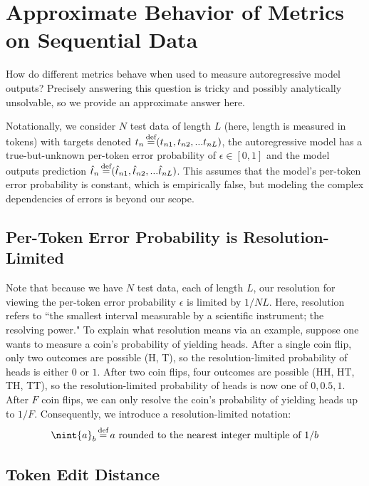 \section{Approximate Behavior of Metrics on Sequential Data}
\label{app:metric_scaling}

How do different metrics behave when used to measure autoregressive model outputs? Precisely answering this question is tricky and possibly analytically unsolvable, so we provide an approximate answer here.

Notationally, we consider $N$ test data of length $L$ (here, length is measured in tokens) with targets denoted $t_n \operatorname{\stackrel{\text{def}}{=}} (t_{n1}, t_{n2}, ... t_{nL})$, the autoregressive model has a true-but-unknown per-token error probability of $\epsilon \in [0, 1]$ and the model outputs prediction $\hat{t}_n \operatorname{\stackrel{\text{def}}{=}} (\hat{t}_{n1}, \hat{t}_{n2}, ... \hat{t}_{nL})$. This assumes that the model's per-token error probability is constant, which is empirically false, but modeling the complex dependencies of errors is beyond our scope.

\subsection{Per-Token Error Probability is Resolution-Limited}
\label{app:metric_scaling:resolution_limited}

Note that because we have $N$ test data, each of length $L$, our resolution for viewing the per-token error probability $\epsilon$ is limited by $1/NL$. 
Here, resolution refers to ``the smallest interval measurable by a scientific instrument; the resolving power."
To explain what resolution means via an example, suppose one wants to measure a coin's probability of yielding heads.
After a single coin flip, only two outcomes are possible (H, T), so the resolution-limited probability of heads is either $0$ or $1$.
After two coin flips, four outcomes are possible (HH, HT, TH, TT), so the resolution-limited probability of heads is now one of $0, 0.5, 1$.
After $F$ coin flips, we can only resolve the coin's probability of yielding heads up to $1/F$.
Consequently, we introduce a resolution-limited notation:
%
\begin{equation}
    \nint{a}_b \defeq \text{$a$ rounded to the nearest integer multiple of $1/b$}
\end{equation}

\subsection{Token Edit Distance}
\label{app:metric_scaling:token_edit_distance}


